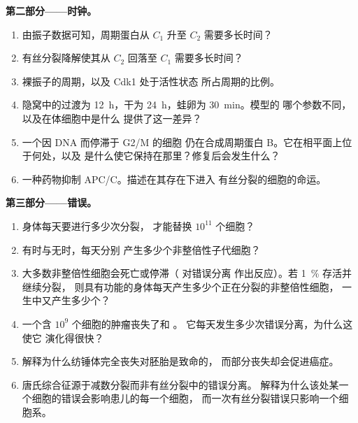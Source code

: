 \begin{problem}
\medskip
\noindent\textbf{第二部分——时钟。}
\begin{enumerate}[resume]
  \item 由振子数据可知，周期蛋白从 $C_{1}$
        升至 $C_{2}$ 需要多长时间？
  \item 有丝分裂降解使其从 $C_{2}$
        回落至 $C_{1}$ 需要多长时间？
  \item 裸振子的周期，以及 Cdk1 处于活性状态
        所占周期的比例。
  \item 隐窝中的过渡为 \qty{12}{h}，干为 \qty{24}{h}，蛙卵为 \qty{30}{min}。模型的
        哪个参数不同，以及在体细胞中是什么
        提供了这一差异？
  \item 一个因 DNA 而停滞于 G2/M 的细胞
        仍在合成周期蛋白 B。它在相平面上位于何处，以及
        是什么使它保持在那里？修复后会发生什么？
  \item 一种药物抑制 APC/C。描述在其存在下进入
        有丝分裂的细胞的命运。
\end{enumerate}

\medskip
\noindent\textbf{第三部分——错误。}
\begin{enumerate}[resume]
  \item 身体每天要进行多少次分裂，
        才能替换 $10^{11}$ 个细胞？
  \item 有时与无时，每天分别
        产生多少个非整倍性子代细胞？
  \item 大多数非整倍性细胞会死亡或停滞（ 对错误分离
        作出反应）。若 \qty{1}{\%} 存活并继续分裂，
        则具有功能的身体每天产生多少个正在分裂的非整倍性细胞，
        一生中又产生多少个？
  \item 一个含 $10^{9}$ 个细胞的肿瘤丧失了和 。
        它每天发生多少次错误分离，为什么这使它
        演化得很快？
  \item 解释为什么纺锤体完全丧失对胚胎是致命的，
        而部分丧失却会促进癌症。
  \item 唐氏综合征源于减数分裂而非有丝分裂中的错误分离。
        解释为什么该处某一个细胞的错误会影响患儿的每一个细胞，
        而一次有丝分裂错误只影响一个细胞系。
\end{enumerate}


\end{problem}
